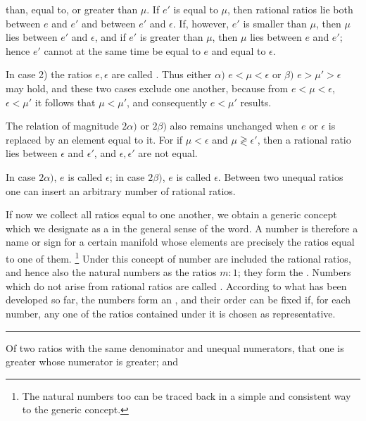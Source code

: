 than, equal to, or greater than $\mu$. If $e'$ is equal to $\mu$, then
rational ratios lie both between $e$ and $e'$ and between $e'$ and
$\epsilon$. If, however, $e'$ is smaller than $\mu$, then $\mu$ lies
between $e'$ and $\epsilon$, and if $e'$ is greater than $\mu$, then
$\mu$ lies between $e$ and $e'$; hence $e'$ cannot at the same time be
equal to $e$ and equal to $\epsilon$.

In case 2) the ratios $e,\epsilon$ are called . Thus
either $\alpha)$ $e<\mu<\epsilon$ or $\beta)$
$e>\mu'>\epsilon$ may hold, and these two cases exclude one another,
because from $e<\mu<\epsilon$, $\epsilon<\mu'$ it follows that
$\mu<\mu'$, and consequently $e<\mu'$ results.

The relation of magnitude $2\alpha)$ or $2\beta)$ also remains
unchanged when $e$ or $\epsilon$ is replaced by an element equal to it.
For if $\mu<\epsilon$ and $\mu\gtrless\epsilon'$, then a rational ratio
lies between $\epsilon$ and $\epsilon'$, and $\epsilon,\epsilon'$ are
not equal.

In case $2\alpha)$, $e$ is called  $\epsilon$;
in case $2\beta)$, $e$ is called  $\epsilon$.
Between two unequal ratios one can insert an arbitrary number of
rational ratios.

If now we collect all ratios equal to one another, we obtain a generic
concept which we designate as a  in the general sense
of the word. A number is therefore a name or sign for a certain
manifold whose elements are precisely the ratios equal to one of them.
\setcounter{footnote}{0}\footnote{The natural numbers too can be traced back in a simple and
consistent way to the generic concept.} Under this concept of number
are included the rational ratios, and hence also the natural numbers as
the ratios $m:1$; they form the . Numbers
which do not arise from rational ratios are called . According to what has been developed so far, the numbers form
an , and their order can be fixed if, for each
number, any one of the ratios contained under it is chosen as
representative.

\begin{center}
\rule{0.18\linewidth}{0.4pt}
\end{center}

Of two ratios with the same denominator and unequal numerators, that
one is greater whose numerator is greater; and
